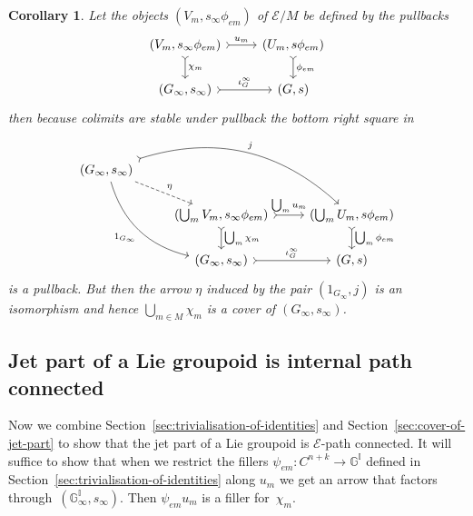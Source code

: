 \documentclass[10pt,a4paper]{amsart}
\numberwithin{equation}{section}
\newtheorem{Corollary}[Theorem]{Corollary}
\begin{document}
\begin{Corollary}\label{corollary:Cover of Ginfty}
Let the objects $(V_{m},s_{\infty}\phi_{em})$ of $\mathcal{E}/M$ be defined by the pullbacks
\begin{equation*}\begin{tikzcd}
(V_{m},s_{\infty}\phi_{em}) \dar[rightarrowtail]{\chi_{m}} \rar[rightarrowtail]{u_m} & (U_{m},s\phi_{em}) \dar[rightarrowtail]{\phi_{em}} \\
(G_{\infty},s_{\infty}) \rar[rightarrowtail]{\iota_G^{\infty}} & (G,s)
\end{tikzcd}\end{equation*}
then because colimits are stable under pullback the bottom right square in
\begin{equation*}\begin{tikzcd}
(G_{\infty},s_{\infty})\arrow[bend left,rightarrowtail]{drr}{j} \arrow[bend right]{ddr}[swap]{1_{G_{\infty}}} \arrow[dashed]{dr}{\eta}& {} & {}\\
{} & (\bigcup_{m}V_{m},s_{\infty}\phi_{em}) \rar[rightarrowtail]{\bigcup_{m}u_m} \dar[rightarrowtail]{\bigcup_m \chi_{m}} & (\bigcup_{m}U_{m},s\phi_{em}) \dar[rightarrowtail]{\bigcup_m \phi_{em}}\\
{} & (G_{\infty},s_{\infty}) \rar[rightarrowtail]{\iota_G^{\infty}} & (G,s)
\end{tikzcd}\end{equation*}
is a pullback. But then the arrow $\eta$ induced by the pair $(1_{G_{\infty}},j)$ is an isomorphism and hence $\bigcup_{m\in M}\chi_{m}$ is a cover of $(G_{\infty},s_{\infty})$.
\end{Corollary}

\subsection{Jet part of a Lie groupoid is internal path connected}\label{sec:jet-part-path-connected}

Now we combine Section~\ref{sec:trivialisation-of-identities} and Section~\ref{sec:cover-of-jet-part} to show that the jet part of a Lie groupoid is $\mathcal{E}$-path connected. It will suf\/f\/ice to show that when we restrict the f\/illers $\psi_{em}\colon C^{n+k}\rightarrow \mathbb{G}^{\mathbb{I}}$ def\/ined in Section~\ref{sec:trivialisation-of-identities} along $u_m$ we get an arrow that factors through~$(\mathbb{G}_{\infty}^{\mathbb{I}},s_{\infty})$. Then $\psi_{em}u_m$ is a f\/iller for~$\chi_m$.
\end{document}
